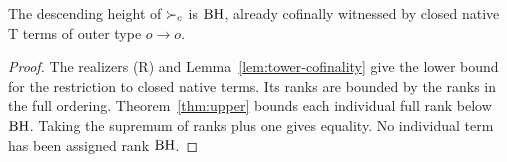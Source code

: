 \begin{theorem}\label{thm:height}
The descending height of $\succ_c$ is $\mathrm{BH}$, already cofinally witnessed
by closed native T terms of outer type $o\to o$.
\end{theorem}
\begin{proof}
The realizers (R) and Lemma~\ref{lem:tower-cofinality} give the
lower bound for the restriction to closed native terms. Its ranks
are bounded by the ranks in the full ordering.
Theorem~\ref{thm:upper} bounds each individual full rank below
$\mathrm{BH}$. Taking the supremum of ranks plus one gives equality.
No individual term has been assigned rank $\mathrm{BH}$.
\end{proof}
